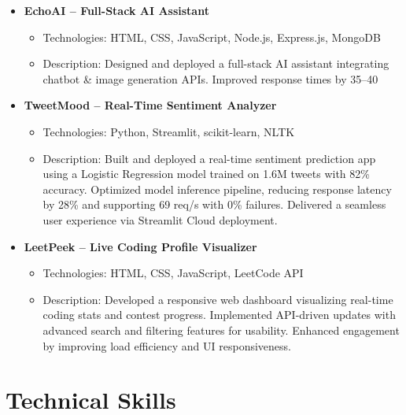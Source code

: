 \documentclass[11pt, a4paper]{article}
\begin{document}
\begin{itemize}[left=0.5cm]
  \item \textbf{EchoAI – Full-Stack AI Assistant} \\
    \begin{itemize}[left=1cm]
      \item Technologies: HTML, CSS, JavaScript, Node.js, Express.js, MongoDB \\
      \item Description: Designed and deployed a full-stack AI assistant integrating chatbot & image generation APIs. Improved response times by 35–40%
    \end{itemize}
  \item \textbf{TweetMood – Real-Time Sentiment Analyzer} \\
    \begin{itemize}[left=1cm]
      \item Technologies: Python, Streamlit, scikit-learn, NLTK \\
      \item Description: Built and deployed a real-time sentiment prediction app using a Logistic Regression model trained on 1.6M tweets with 82\% accuracy. Optimized model inference pipeline, reducing response latency by 28\% and supporting 69 req/s with 0\% failures. Delivered a seamless user experience via Streamlit Cloud deployment.
    \end{itemize}
  \item \textbf{LeetPeek – Live Coding Profile Visualizer} \\
    \begin{itemize}[left=1cm]
      \item Technologies: HTML, CSS, JavaScript, LeetCode API \\
      \item Description: Developed a responsive web dashboard visualizing real-time coding stats and contest progress. Implemented API-driven updates with advanced search and filtering features for usability. Enhanced engagement by improving load efficiency and UI responsiveness.
    \end{itemize}
\end{itemize}

\vspace{0.3cm}

\section{Technical Skills}
\end{document}
